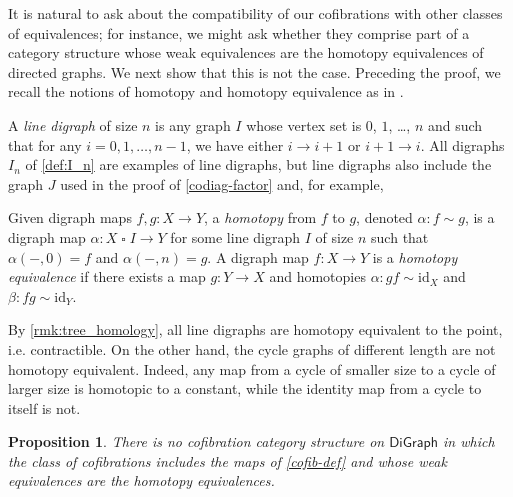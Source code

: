 \documentclass[11pt]{article}
\newtheorem{proposition}[theo]{Proposition}
\theoremstyle{definition}
\numberwithin{equation}{section}
\newcommand{\DiGraph}{\mathsf{DiGraph}}
\newcommand{\id}[1][]{\mathrm{id}_{#1}}
\newcommand{\gtimes}{\mathbin{\square}}
\newcommand{\from}{\colon}
\begin{document}
It is natural to ask about the compatibility of our cofibrations with other classes of equivalences; for instance, we might ask whether they comprise part of a category structure whose weak equivalences are the homotopy equivalences of directed graphs. 
We next show that this is not the case. Preceding the proof, we recall the notions of homotopy and homotopy equivalence as in \cite{grigor'yan-lin-muranov-yau:homotopy}.

A \emph{line digraph} of size $n$ is any graph $I$ whose vertex set is $0$, $1$, \ldots, $n$ and such that for any $i = 0, 1, \ldots, n-1$, we have either $i \to i+1$ or $i+1 \to i$.
All digraphs $I_n$ of \cref{def:I_n} are examples of line digraphs, but line digraphs also include the graph $J$ used in the proof of \cref{codiag-factor} and, for example,
    \begin{figure}[H]
    \centering
    \end{figure}
Given digraph maps $f, g \colon X \to Y$, a \emph{homotopy} from $f$ to $g$, denoted $\alpha \colon f \sim g$, is a digraph map $\alpha \from X \gtimes I \to Y$ for some line digraph $I$ of size $n$ such that $\alpha(-, 0) = f$ and $\alpha(-, n) = g$.
A digraph map $f \from X \to Y$ is a \emph{homotopy equivalence} if there exists a map $g \from Y \to X$ and homotopies $\alpha \from gf \sim \id[X]$ and $\beta \from fg \sim \id[Y]$.

By \cref{rmk:tree_homology}, all line digraphs are homotopy equivalent to the point, i.e.  contractible.
On the other hand, the cycle graphs of different length are not homotopy equivalent.
Indeed, any map from a cycle of smaller size to a cycle of larger size is homotopic to a constant, while the identity map from a cycle to itself is not.

\begin{proposition}
There is no cofibration category structure on $\DiGraph$ in which the class of cofibrations includes the maps of \cref{cofib-def} and whose weak equivalences are the homotopy equivalences.
\end{proposition}
\end{document}
